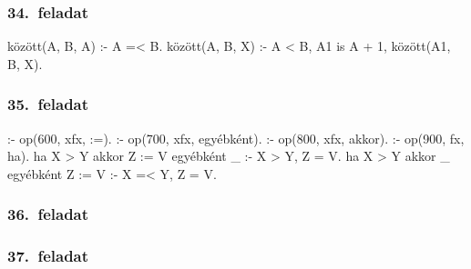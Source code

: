 \subsubsection*{34.~feladat}
\begin{program}
között(A, B, A) :- A =< B. 
között(A, B, X) :-
    A < B, A1 is A + 1,
    között(A1, B, X). 
\end{program}
\subsubsection*{35.~feladat}
\begin{program}
:- op(600, xfx, :=). 
:- op(700, xfx, egyébként). 
:- op(800, xfx, akkor). 
:- op(900, fx, ha). 
ha X > Y akkor Z := V egyébként _ :- X > Y, Z = V. 
ha X > Y akkor _ egyébként Z := V :- X =< Y, Z = V. 
\end{program}
\subsubsection*{36.~feladat}
\begin{query}

\end{query}
\subsubsection*{37.~feladat}
\begin{program}

\end{program}

